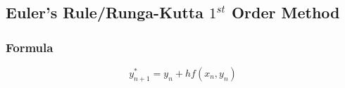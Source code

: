 \subsection{Euler's Rule/Runga-Kutta $1^{st}$ Order Method}

\subsubsection{Formula}

\[{y}^*_{n+1} = y_n + hf(x_n, y_n)\]